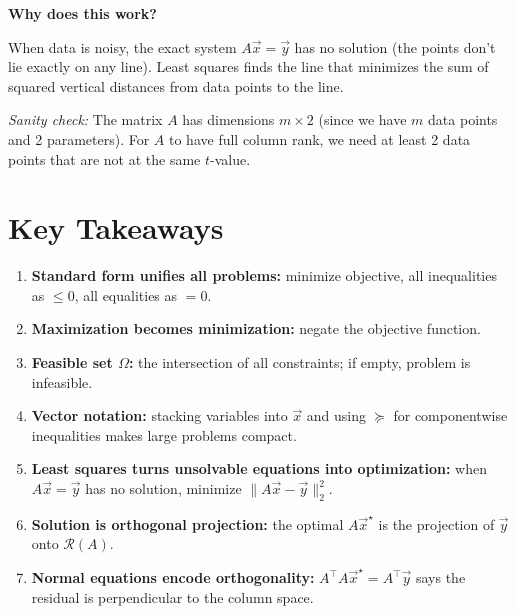 \documentclass[10pt, twocolumn]{article}
\theoremstyle{definition}
\theoremstyle{plain}
\newcommand{\Range}{\mathcal{R}}
\begin{document}
\textbf{Why does this work?}

When data is noisy, the exact system $A\vec{x} = \vec{y}$ has no solution (the points don't lie exactly on any line). Least squares finds the line that minimizes the sum of squared vertical distances from data points to the line.

\textit{Sanity check:} The matrix $A$ has dimensions $m \times 2$ (since we have $m$ data points and 2 parameters). For $A$ to have full column rank, we need at least 2 data points that are not at the same $t$-value. \checkmark


\vfill

\section*{Key Takeaways}

\begin{enumerate}
    \item \textbf{Standard form unifies all problems:} minimize objective, all inequalities as $\le 0$, all equalities as $= 0$.
    \item \textbf{Maximization becomes minimization:} negate the objective function.
    \item \textbf{Feasible set $\Omega$:} the intersection of all constraints; if empty, problem is infeasible.
    \item \textbf{Vector notation:} stacking variables into $\vec{x}$ and using $\succeq$ for componentwise inequalities makes large problems compact.
    \item \textbf{Least squares turns unsolvable equations into optimization:} when $A\vec{x} = \vec{y}$ has no solution, minimize $\|A\vec{x} - \vec{y}\|_2^2$.
    \item \textbf{Solution is orthogonal projection:} the optimal $A\vec{x}^\star$ is the projection of $\vec{y}$ onto $\Range(A)$.
    \item \textbf{Normal equations encode orthogonality:} $A^\top A \vec{x}^\star = A^\top \vec{y}$ says the residual is perpendicular to the column space.
\end{enumerate}
\end{document}
